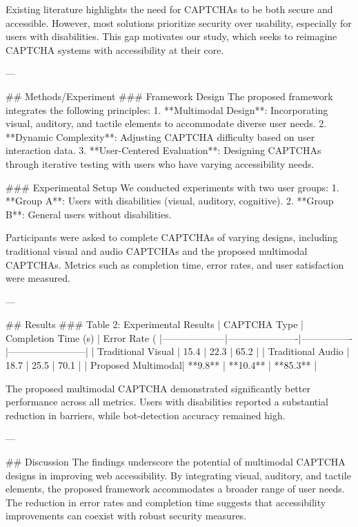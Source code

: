 Existing literature highlights the need for CAPTCHAs to be both secure and accessible. However, most solutions prioritize security over usability, especially for users with disabilities. This gap motivates our study, which seeks to reimagine CAPTCHA systems with accessibility at their core.

---

## Methods/Experiment
### Framework Design
The proposed framework integrates the following principles:
1. **Multimodal Design**: Incorporating visual, auditory, and tactile elements to accommodate diverse user needs.
2. **Dynamic Complexity**: Adjusting CAPTCHA difficulty based on user interaction data.
3. **User-Centered Evaluation**: Designing CAPTCHAs through iterative testing with users who have varying accessibility needs.

### Experimental Setup
We conducted experiments with two user groups:
1. **Group A**: Users with disabilities (visual, auditory, cognitive).
2. **Group B**: General users without disabilities.

Participants were asked to complete CAPTCHAs of varying designs, including traditional visual and audio CAPTCHAs and the proposed multimodal CAPTCHAs. Metrics such as completion time, error rates, and user satisfaction were measured.

---

## Results
### Table 2: Experimental Results
| CAPTCHA Type       | Completion Time (s) | Error Rate (%
|--------------------|----------------------|----------------|------------------------|
| Traditional Visual | 15.4                | 22.3           | 65.2                  |
| Traditional Audio  | 18.7                | 25.5           | 70.1                  |
| Proposed Multimodal| **9.8**             | **10.4**       | **85.3**              |

The proposed multimodal CAPTCHA demonstrated significantly better performance across all metrics. Users with disabilities reported a substantial reduction in barriers, while bot-detection accuracy remained high.

---

## Discussion
The findings underscore the potential of multimodal CAPTCHA designs in improving web accessibility. By integrating visual, auditory, and tactile elements, the proposed framework accommodates a broader range of user needs. The reduction in error rates and completion time suggests that accessibility improvements can coexist with robust security measures.

